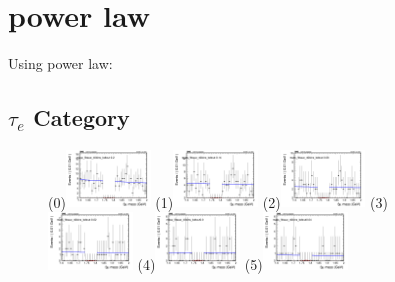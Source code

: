 \section{power law}
\label{sec:power_law}

Using power law:


\subsection{$\tau_{e}$ Category}
\label{sec:taue}

\begin{figure}[h!]
        \centering
        \subfigure(0){\includegraphics[width=0.2\textwidth]{power_law/plots/taue/massfit_taue_40bins_bdtcut-0.2.png}}
        \subfigure(1){\includegraphics[width=0.2\textwidth]{power_law/plots/taue/massfit_taue_40bins_bdtcut-0.14.png}}
        \subfigure(2){\includegraphics[width=0.2\textwidth]{power_law/plots/taue/massfit_taue_40bins_bdtcut-0.08.png}}
        \subfigure(3){\includegraphics[width=0.2\textwidth]{power_law/plots/taue/massfit_taue_40bins_bdtcut-0.02.png}}
        \subfigure(4){\includegraphics[width=0.2\textwidth]{power_law/plots/taue/massfit_taue_40bins_bdtcut0.0.png}}
        \subfigure(5){\includegraphics[width=0.2\textwidth]{power_law/plots/taue/massfit_taue_40bins_bdtcut0.04.png}}

\end{figure}
